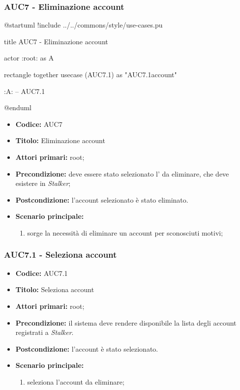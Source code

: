 \documentclass[casi-duso]{subfiles}
\begin{document}
\subsubsection{AUC7 - Eliminazione account}%
\label{subsub:AUC7}

\begin{plantuml}
@startuml
!include ../../commons/style/use-cases.pu

title AUC7 - Eliminazione account

actor :root: as A

rectangle {
  together {
    usecase (AUC7.1) as "AUC7.1\nSeleziona account"
  }
}

:A: -- AUC7.1

@enduml
\end{plantuml}

\begin{itemize}
  \item \textbf{Codice:} AUC7
  \item \textbf{Titolo:} Eliminazione account
  \item \textbf{Attori primari:} root;
  \item \textbf{Precondizione:} deve essere stato selezionato l' da eliminare, che deve esistere in \emph{Stalker};
  \item \textbf{Postcondizione:} l'account selezionato è stato eliminato.
  \item \textbf{Scenario principale:}
  \begin{enumerate}
    \item sorge la necessità di eliminare un account per sconosciuti motivi;
  \end{enumerate}
\end{itemize}

\subsubsection{AUC7.1 - Seleziona account}%
\label{subsub:AUC7.1}
\begin{itemize}
  \item \textbf{Codice:} AUC7.1
  \item \textbf{Titolo:} Seleziona account
  \item \textbf{Attori primari:} root;
  \item \textbf{Precondizione:} il sistema deve rendere disponibile la lista degli account registrati a \emph{Stalker}.
  \item \textbf{Postcondizione:} l'account è stato selezionato.
  \item \textbf{Scenario principale:}
  \begin{enumerate}
    \item {} seleziona l'account da eliminare;
  \end{enumerate}
\end{itemize}
\end{document}
